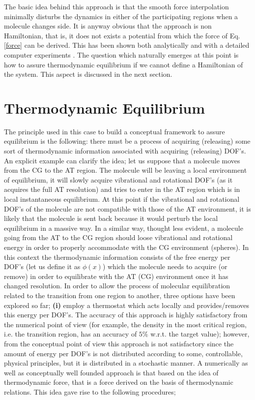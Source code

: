 \documentclass[aps,pre,preprint]{revtex4}
\begin{document}
The basic idea behind this approach is that the smooth force interpolation minimally disturbs the dynamics in either of the
participating regions when a molecule changes side.
It is anyway obvious that the approach is non Hamiltonian, that is, it does not exists a potential from which the force of Eq.\ref{force} can be derived. This has been shown both analytically \cite{presolo} and with a detailed computer experiments \cite{prlcomm}. The question which naturally emerges at this point is how to assure thermodynamic equilibrium if we cannot define a Hamiltonian of the system. This aspect is discussed in the next section.

\section{Thermodynamic Equilibrium}
The principle used in this case to build a conceptual framework to assure equilibrium is the following:  there must be a process of acquiring (releasing) some sort of thermodynamic information
  associated with acquiring (releasing) DOF's. An explicit example can clarify 
the idea; let us suppose that a molecule moves from the CG to the AT region.
The molecule will be leaving a local environment of equilibrium, it will slowly acquire vibrational and rotational DOF's (as it acquires the full AT resolution) and tries to enter in the AT region which is in local instantaneous equilibrium. 
At this point if the vibrational and rotational DOF's of the molecule are not compatible with those of the AT environment, it is likely that the molecule is sent back because it would perturb the local equilibrium in a massive way. In a similar way, thought less evident, a molecule going from the AT to the CG region should loose vibrational and rotational energy in order to properly accommodate with the CG environment (spheres). In this context the thermodynamic information consists of the free energy per DOF's (let us define it as $\phi(x)$) which the molecule needs to acquire (or remove) in order to equilibrate with the AT (CG) environment once it has changed resolution. In order to allow the process of molecular equilibration related to the transition from one region to another, three options have been explored so far; {\bf (i)} employ a thermostat which acts locally and provides/removes this energy per DOF's. The accuracy of this approach is highly satisfactory  from the numerical point of view (for example, the density in the most critical region, i.e. the transition region, has an accuracy of $5\%$ w.r.t. the target value); however, from the conceptual point of view this approach is not satisfactory  since the amount of energy per DOF's is not distributed according to some, controllable, physical principles, but it is distributed in a stochastic manner. A numerically as well as conceptually well founded approach is that based on the idea of thermodynamic force, that is a force derived on the basis of thermodynamic relations. This idea gave rise to the following procedures;
\end{document}

